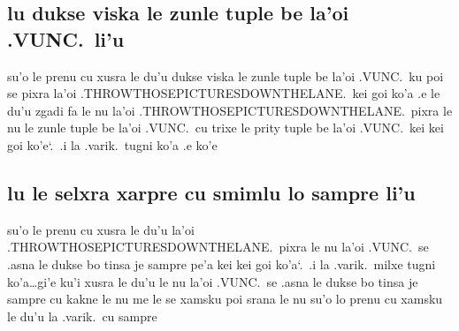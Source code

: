 \documentclass{report}
\newcommand\sds{\spacefactor\sfcode`.\ \space}
\begin{document}
\subsection{lu dukse viska le zunle tuple be la'oi .VUNC.\ li'u}
su'o le prenu cu xusra le du'u dukse viska le zunle tuple be la'oi .VUNC.\ ku poi se pixra la'oi .THROWTHOSEPICTURESDOWNTHELANE.\ kei goi ko'a .e le du'u zgadi fa le nu la'oi .THROWTHOSEPICTURESDOWNTHELANE.\ pixra le nu le zunle tuple be la'oi .VUNC.\ cu trixe le prity tuple be la'oi .VUNC.\ kei kei goi ko'e\sds  .i la .varik.\ tugni ko'a .e ko'e

\subsection{lu le selxra xarpre cu smimlu lo sampre li'u}
su'o le prenu cu xusra le du'u la'oi .THROWTHOSEPICTURESDOWNTHELANE.\ pixra le nu la'oi .VUNC.\ se .asna le dukse bo tinsa je sampre pe'a kei kei goi ko'a\sds  .i la .varik.\ milxe tugni ko'a\ldots gi'e ku'i xusra le du'u le nu la'oi .VUNC.\ se .asna le dukse bo tinsa je sampre cu kakne le nu me le se xamsku poi srana le nu su'o lo prenu cu xamsku le du'u la .varik.\ cu sampre
\end{document}
